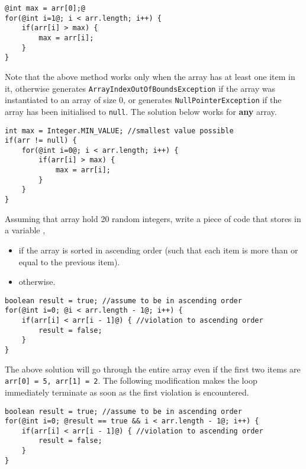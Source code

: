 \begin{questions}
\begin{solution}
\begin{lstlisting}[style=buggy]
@int max = arr[0];@
for(@int i=1@; i < arr.length; i++) {
	if(arr[i] > max) {
		max = arr[i];
	}
}
\end{lstlisting}

Note that the above method works only when the array has at least one item in it, otherwise generates \texttt{ArrayIndexOutOfBoundsException} if the array was instantiated to an array of size 0, or generates \texttt{NullPointerException} if the array has been initialised to \texttt{null}. The solution below works for \textbf{any} array.

\begin{lstlisting}[style=correct]
int max = Integer.MIN_VALUE; //smallest value possible
if(arr != null) {
	for(@int i=0@; i < arr.length; i++) {
		if(arr[i] > max) {
			max = arr[i];
		}
	}
}
\end{lstlisting}
\end{solution}

\question Assuming that array  hold 20 random integers, write a piece of code that stores in a variable ,

\begin{itemize}
\item {} if the array  is sorted in ascending order (such that each item is more than or equal to the previous item).
\item {} otherwise.	
\end{itemize}

\begin{solution}
\begin{lstlisting}[style=correct]
boolean result = true; //assume to be in ascending order
for(@int i=0; @i < arr.length - 1@; i++) {
	if(arr[i] < arr[i - 1]@) { //violation to ascending order
		result = false;
	}
}
\end{lstlisting}

The above solution will go through the entire array even if the first two items are \texttt{arr[0] = 5, arr[1] = 2}. The following modification makes the loop immediately terminate as soon as the first violation is encountered.

\begin{lstlisting}[style=correct]
boolean result = true; //assume to be in ascending order
for(@int i=0; @result == true && i < arr.length - 1@; i++) {
	if(arr[i] < arr[i - 1]@) { //violation to ascending order
		result = false;
	}
}
\end{lstlisting}
\end{solution}


\end{questions}
